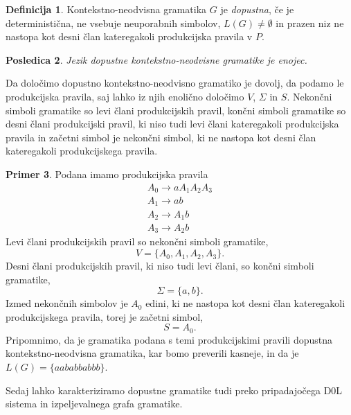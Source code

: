 \documentclass{amsart}
\theoremstyle{definition}
\newtheorem{definicija}{Definicija}[section]
\newtheorem{primer}[definicija]{Primer}
\theoremstyle{plain} %
\newtheorem{posledica}[definicija]{Posledica}
\begin{document}
\begin{definicija}
    
    Kontekstno-neodvisna gramatika $G$ je \textit{dopustna}, če je deterministična, ne vsebuje neuporabnih simbolov,
    $ L(G) \neq \emptyset $ in prazen niz ne nastopa kot desni član kateregakoli produkcijska pravila v $ P $.

\end{definicija}

\begin{posledica}
    
    Jezik dopustne kontekstno-neodvisne gramatike je enojec. 

\end{posledica}

Da določimo dopustno kontekstno-neodvisno gramatiko je dovolj, da podamo le produkcijska pravila,
saj lahko iz njih enolično določimo $ V $, $ \Sigma $ in $ S $. Nekončni simboli gramatike
so levi člani produkcijskih pravil, končni simboli gramatike so desni člani produkcijski pravil, ki
niso tudi levi člani kateregakoli produkcijska pravila in začetni simbol je nekončni simbol, ki 
ne nastopa kot desni član kateregakoli produkcijskega pravila.

\begin{primer}
    Podana imamo produkcijska pravila
    \begin{gather*}
        A_0 \rightarrow aA_1A_2A_3 \\
        A_1 \rightarrow ab \\
        A_2 \rightarrow A_1b \\
        A_3 \rightarrow A_2b
    \end{gather*}
    Levi člani produkcijskih pravil so nekončni simboli gramatike,
    \[
        V = \{ A_0, A_1, A_2, A_3 \}.
    \]
    Desni člani produkcijskih pravil, ki niso tudi levi člani, so končni simboli gramatike,
    \[
        \Sigma = \{ a, b \}.
    \]
    Izmed nekončnih simbolov je $ A_0 $ edini, ki ne nastopa kot desni član kateregakoli
    produkcijskega pravila, torej je začetni simbol,
    \[
        S = A_0.
    \]
    Pripomnimo, da je gramatika podana s temi produkcijskimi pravili dopustna kontekstno-neodvisna
    gramatika, kar bomo preverili kasneje, in da je $ L(G) = \{ aababbabbb \} $.
\end{primer}

Sedaj lahko karakteriziramo dopustne gramatike tudi preko pripadajočega D0L sistema in izpeljevalnega
grafa gramatike.
\end{document}
